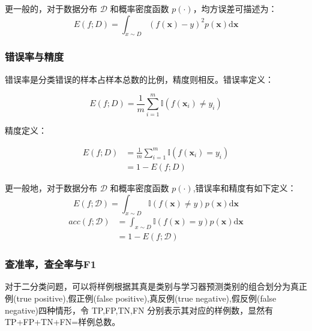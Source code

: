 更一般的，对于数据分布 $\mathcal{D}$ 和概率密度函数 $p(\cdot)$，均方误差可描述为：
\begin{equation}
    E(f;D) = \int_{x\sim D}(f(\bm{x})-y)^2p(\bm{x})\text{d}\bm{x}
\end{equation}

\subsubsection{错误率与精度}

错误率是分类错误的样本占样本总数的比例，精度则相反。错误率定义：

\begin{equation}
    E(f;D) = \frac{1}{m}\sum_{i=1}^m \mathbb{I} (f(\bm{x}_i)\neq y_i)
\end{equation}

精度定义：

\begin{equation}
    \begin{aligned}
        E(f;D) & = \frac{1}{m}\sum_{i=1}^m \mathbb{I} (f(\bm{x}_i) = y_i) \\
               & = 1 - E(f;D)
    \end{aligned}
\end{equation}

更一般地，对于数据分布 $\mathcal{D}$ 和概率密度函数 $p(\cdot)$,错误率和精度有如下定义：
\begin{equation}
    E(f;\mathcal{D}) = \int_{x\sim D} \mathbb{I} (f(\bm{x})\neq y)p(\bm{x})\text{d}\bm{x}
\end{equation}
\begin{equation}
    \begin{aligned}
        acc(f;\mathcal{D}) & = \int_{x\sim D} \mathbb{I} (f(\bm{x})= y)p(\bm{x})\text{d}\bm{x} \\
                        & = 1 - E(f;\mathcal{D})
    \end{aligned}
\end{equation}

\subsubsection{查准率，查全率与F1}

对于二分类问题，可以将样例根据其真是类别与学习器预测类别的组合划分为真正例(true positive),假正例(false positive),真反例(true negative),假反例(false negative)四种情形，令 TP,FP,TN,FN 分别表示其对应的样例数，显然有 TP+FP+TN+FN=样例总数。

